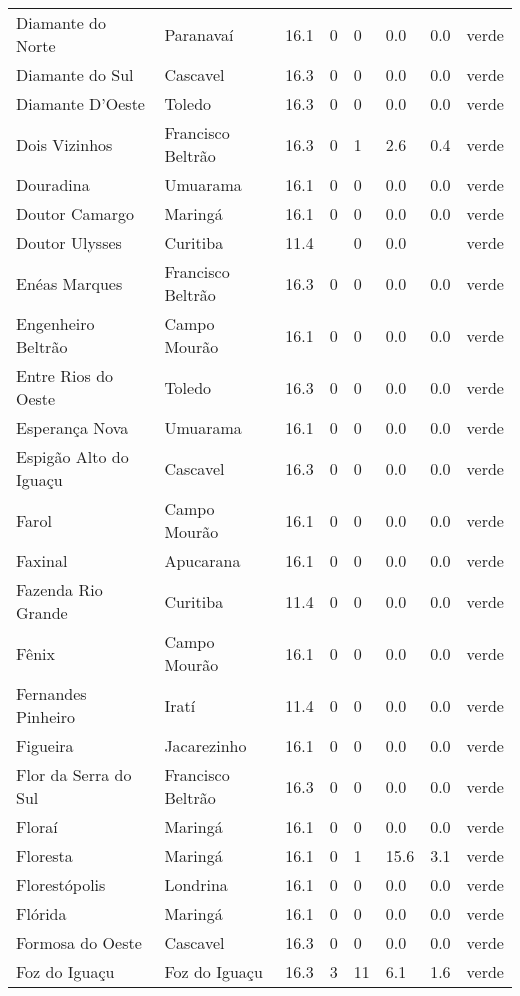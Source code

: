 \begin{longtable}{l|lllllll}
  Diamante do Norte & Paranavaí & 16.1 & 0 & 0 & 0.0 & 0.0 & verde \\ 
  Diamante do Sul & Cascavel & 16.3 & 0 & 0 & 0.0 & 0.0 & verde \\ 
  Diamante D'Oeste & Toledo & 16.3 & 0 & 0 & 0.0 & 0.0 & verde \\ 
  Dois Vizinhos & Francisco Beltrão & 16.3 & 0 & 1 & 2.6 & 0.4 & verde \\ 
  Douradina & Umuarama & 16.1 & 0 & 0 & 0.0 & 0.0 & verde \\ 
  Doutor Camargo & Maringá & 16.1 & 0 & 0 & 0.0 & 0.0 & verde \\ 
  Doutor Ulysses & Curitiba & 11.4 &  & 0 & 0.0 &  & verde \\ 
  Enéas Marques & Francisco Beltrão & 16.3 & 0 & 0 & 0.0 & 0.0 & verde \\ 
  Engenheiro Beltrão & Campo Mourão & 16.1 & 0 & 0 & 0.0 & 0.0 & verde \\ 
  Entre Rios do Oeste & Toledo & 16.3 & 0 & 0 & 0.0 & 0.0 & verde \\ 
  Esperança Nova & Umuarama & 16.1 & 0 & 0 & 0.0 & 0.0 & verde \\ 
  Espigão Alto do Iguaçu & Cascavel & 16.3 & 0 & 0 & 0.0 & 0.0 & verde \\ 
  Farol & Campo Mourão & 16.1 & 0 & 0 & 0.0 & 0.0 & verde \\ 
  Faxinal & Apucarana & 16.1 & 0 & 0 & 0.0 & 0.0 & verde \\ 
  Fazenda Rio Grande & Curitiba & 11.4 & 0 & 0 & 0.0 & 0.0 & verde \\ 
  Fênix & Campo Mourão & 16.1 & 0 & 0 & 0.0 & 0.0 & verde \\ 
  Fernandes Pinheiro & Iratí & 11.4 & 0 & 0 & 0.0 & 0.0 & verde \\ 
  Figueira & Jacarezinho & 16.1 & 0 & 0 & 0.0 & 0.0 & verde \\ 
  Flor da Serra do Sul & Francisco Beltrão & 16.3 & 0 & 0 & 0.0 & 0.0 & verde \\ 
  Floraí & Maringá & 16.1 & 0 & 0 & 0.0 & 0.0 & verde \\ 
  Floresta & Maringá & 16.1 & 0 & 1 & 15.6 & 3.1 & verde \\ 
  Florestópolis & Londrina & 16.1 & 0 & 0 & 0.0 & 0.0 & verde \\ 
  Flórida & Maringá & 16.1 & 0 & 0 & 0.0 & 0.0 & verde \\ 
  Formosa do Oeste & Cascavel & 16.3 & 0 & 0 & 0.0 & 0.0 & verde \\ 
  Foz do Iguaçu & Foz do Iguaçu & 16.3 & 3 & 11 & 6.1 & 1.6 & verde \\ 

\end{longtable}
